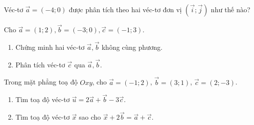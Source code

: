 \begin{bt}%
	Véc-tơ $\overrightarrow{a}=(-4;0)$ được phân tích theo hai véc-tơ đơn vị $\left(\overrightarrow{i};\overrightarrow{j}\right)$ như thế nào?
\end{bt}

\begin{bt}%
	Cho $\overrightarrow{a}=(1;2),\overrightarrow{b}=(-3;0),\overrightarrow{c}=(-1;3)$.
	\begin{enumerate}
		\item Chứng minh hai véc-tơ $\overrightarrow{a},\overrightarrow{b}$ không cùng phương.
		\item Phân tích véc-tơ $\overrightarrow{c}$ qua $\overrightarrow{a},\overrightarrow{b}$.
	\end{enumerate}
\end{bt}

\begin{bt}%
	Trong mặt phẳng toạ độ $Oxy$, cho $\overrightarrow{a}=(-1;2)$, $\overrightarrow{b}=(3;1)$, $\overrightarrow{c}=(2;-3)$.
	\begin{enumerate}
		\item Tìm toạ độ véc-tơ $\overrightarrow{u}=2\overrightarrow{a}+\overrightarrow{b}-3\overrightarrow{c}$.
		\item Tìm toạ độ véc-tơ $\overrightarrow{x}$ sao cho $\overrightarrow{x}+2\overrightarrow{b}=\overrightarrow{a}+\overrightarrow{c}$.
	\end{enumerate}
\end{bt}

